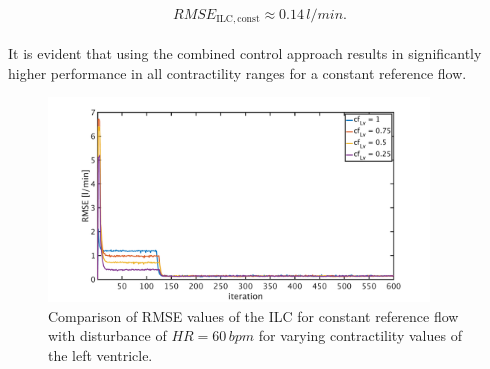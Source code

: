 \begin{equation}
  RMSE_{\mathrm{ILC,const}}\approx0.14\,l/min.
\end{equation}
\\It is evident that using the combined control approach results in significantly higher performance in all contractility ranges for a constant reference flow.
\begin{figure}[ht!]
  \centering
  \includegraphics[width=0.9\textwidth]{images/chapt_5/ILC/RMSE_dist_const_5_var_cf.pdf}
  \caption[RMSE Comparison of ILC at constant reference flow for varying left ventricular contractilities]{Comparison of RMSE values of the ILC for constant reference flow with disturbance of $HR=60\,bpm$ for varying contractility values of the left ventricle.}
  \label{fig:RMSE_dist_const_5_var_cf}
\end{figure}

